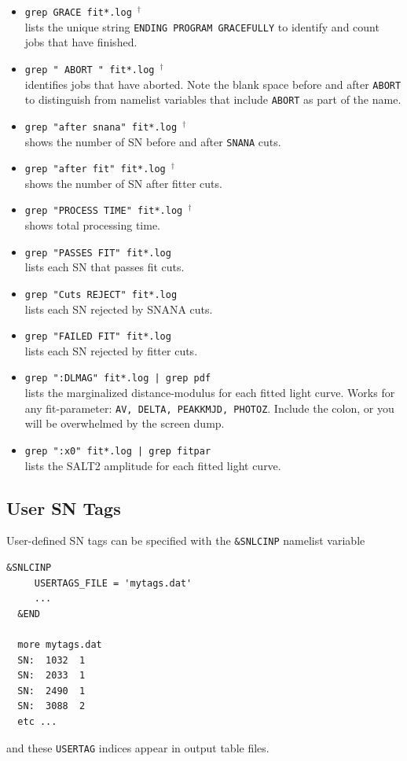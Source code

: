 \documentclass[12pt]{article}
\newcommand{\jobend}{\mbox{~$^\dagger$}}
\begin{document}
\begin{itemize}
%
  \item	{\tt grep GRACE fit*.log}{\jobend} \\
    	lists the unique string
   	{\tt ENDING PROGRAM GRACEFULLY} to identify and count
   	jobs that have finished.
%
  \item	{\tt grep " ABORT " fit*.log}{\jobend} \\
   	identifies jobs that have aborted. Note the
    	blank space before and after {\tt ABORT} to distinguish
    	from namelist variables that include {\tt ABORT}
	as part of the name.
%
 \item	{\tt grep "after snana" fit*.log}{\jobend} \\
	shows the number of SN before and after {\tt SNANA} cuts.
%
 \item	{\tt grep "after fit" fit*.log}{\jobend} \\
	shows the number of SN after fitter cuts.
%
 \item	{\tt grep "PROCESS TIME" fit*.log}{\jobend} \\
	shows total processing time.
%
\item 	{\tt grep "PASSES FIT" fit*.log} \\
	lists each SN that passes fit cuts.
%
 \item 	{\tt grep "Cuts REJECT" fit*.log} \\
	lists each SN rejected by SNANA cuts.
%
 \item 	{\tt grep "FAILED FIT" fit*.log} \\
	lists each SN rejected by fitter cuts.
%
 \item	{\tt grep ":DLMAG" fit*.log | grep pdf} \\
	lists the marginalized distance-modulus for each 
	fitted light curve. Works for any fit-parameter:
	{\tt AV, DELTA, PEAKKMJD, PHOTOZ}. 
	Include the colon, or you will be overwhelmed by the
	screen dump.
%
 \item	{\tt grep ":x0" fit*.log | grep fitpar} \\
	lists the SALT2 amplitude for each 
	fitted light curve.
\end{itemize}


\subsection{User SN Tags }
\label{subsec:usertags}

User-defined SN tags can be specified with the
{\tt \&SNLCINP} namelist variable
\begin{Verbatim}[frame=single]
  &SNLCINP
     USERTAGS_FILE = 'mytags.dat'
     ...
  &END

  more mytags.dat
  SN:  1032  1
  SN:  2033  1
  SN:  2490  1
  SN:  3088  2
  etc ...
\end{Verbatim}
%
and these {\tt USERTAG} indices appear in output table files.
\end{document}
